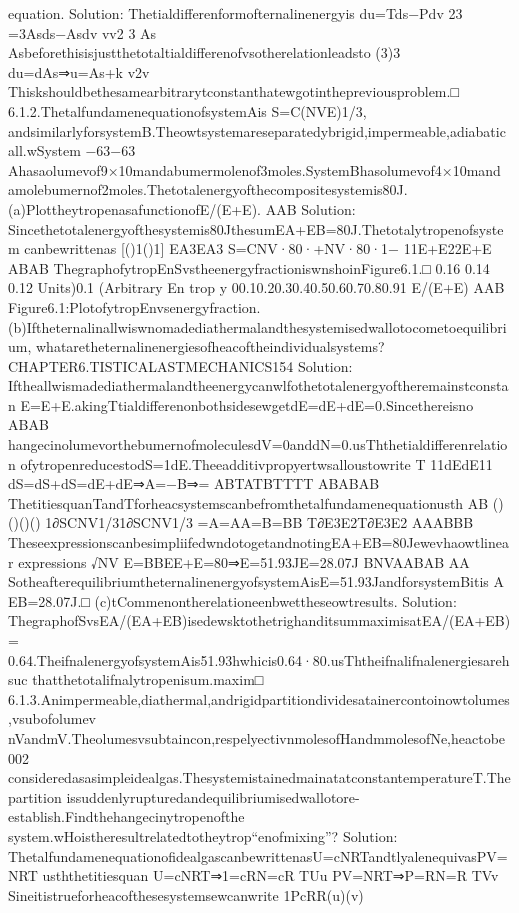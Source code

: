 {{{{{{{{{{equation.
Solution:
Thetialdifferenformofternalinenergyis
du=Tds−Pdv
23
=3Asds−Asdv
vv2
3
As
Asbeforethisisjustthetotaltialdifferenofvsotherelationleadsto
(3)3
du=dAs⇒u=As+k
v2v
Thiskshouldbethesamearbitrarytconstanthatewgotinthepreviousproblem.□
6.1.2.ThetalfundamenequationofsystemAis
S=C(NVE)1/3,
andsimilarlyforsystemB.Theowtsystemareseparatedybrigid,impermeable,adiabaticall.wSystem
−63−63
Ahasaolumevof9×10mandabumermolenof3moles.SystemBhasolumevof4×10mand
amolebumernof2moles.Thetotalenergyofthecompositesystemis80J.
(a)PlottheytropenasafunctionofE/(E+E).
AAB
Solution:
Sincethetotalenergyofthesystemis80JthesumEA+EB=80J.Thetotalytropenofsystem
canbewrittenas
[{()}1{()}1]
EA3EA3
S=CNV·80·+NV·80·1−
11E+E22E+E
ABAB
ThegraphofytropEnSvstheenergyfractioniswnshoinFigure6.1.□
0.16
0.14
0.12
Units)0.1
(Arbitrary
En
trop
y
00.10.20.30.40.50.60.70.80.91
E/(E+E)
AAB
Figure6.1:PlotofytropEnvsenergyfraction.
(b)Iftheternalinallwiswnomadediathermalandthesystemisedwallotocometoequilibrium,
whataretheternalinenergiesofheacoftheindividualsystems?
CHAPTER6.TISTICALASTMECHANICS154
Solution:
Iftheallwismadediathermalandtheenergycanwlfothetotalenergyoftheremainstconstan
E=E+E.akingTtialdifferenonbothsidesewgetdE=dE+dE=0.Sincethereisno
ABAB
hangecinolumevorthebumernofmoleculesdV=0anddN=0.usThthetialdifferenrelation
ofytropenreducestodS=1dE.Theeadditivpropyertwsalloustowrite
T
11dEdE11
dS=dS+dS=dE+dE⇒A=−B⇒=
ABTATBTTTT
ABABAB
ThetitiesquanTandTforheacsystemscanbefromthetalfundamenequationusth
AB
()()()()
1∂SCNV1/31∂SCNV1/3
=A=AA=B=BB
T∂E3E2T∂E3E2
AAABBB
TheseexpressionscanbesimpliifedwndotogetandnotingEA+EB=80Jewevhaowtlinear
expressions
√NV
E=BBEE+E=80⇒E=51.93JE=28.07J
BNVAABAB
AA
SotheafterequilibriumtheternalinenergyofsystemAisE=51.93JandforsystemBitis
A
EB=28.07J.□
(c)tCommenontherelationeenbwettheseowtresults.
Solution:
ThegraphofSvsEA/(EA+EB)isedewsktothetrighanditsummaximisatEA/(EA+EB)=
0.64.TheifnalenergyofsystemAis51.93hwhicis0.64·80.usThtheifnalifnalenergiesarehsuc
thatthetotalifnalytropenisum.maxim□
6.1.3.Animpermeable,diathermal,andrigidpartitiondividesatainercontoinowtolumes,vsubofolumev
nVandmV.Theolumesvsubtaincon,respelyectivnmolesofHandmmolesofNe,heactobe
002
consideredasasimpleidealgas.ThesystemistainedmainatatconstantemperatureT.Thepartition
issuddenlyrupturedandequilibriumisedwallotore-establish.Findthehangecinytropenofthe
system.wHoistheresultrelatedtotheytrop“enofmixing”?
Solution:
ThetalfundamenequationofidealgascanbewrittenasU=cNRTandtlyalenequivasPV=NRT
usththetitiesquan
U=cNRT⇒1=cRN=cR
TUu
PV=NRT⇒P=RN=R
TVv
Sineitistrueforheacofthesesystemsewcanwrite
1PcRR(u)(v)
}}}}}}}}}}
